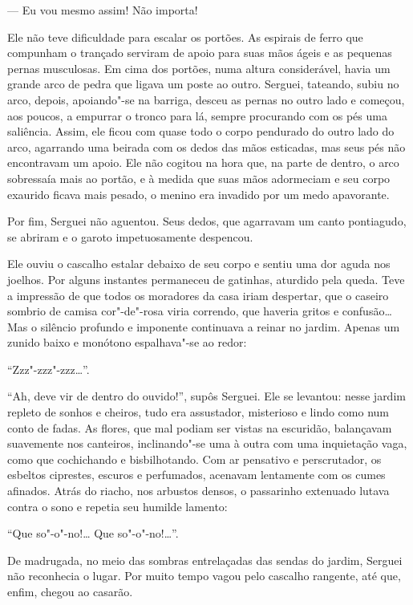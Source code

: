 
--- Eu vou mesmo assim! Não importa!

Ele não teve dificuldade para escalar os portões. As espirais de ferro
que compunham o trançado serviram de apoio para suas mãos ágeis e as
pequenas pernas musculosas. Em cima dos portões, numa altura
considerável, havia um grande arco de pedra que ligava um poste ao
outro. Serguei, tateando, subiu no arco, depois, apoiando"-se na barriga,
desceu as pernas no outro lado e começou, aos poucos, a empurrar o
tronco para lá, sempre procurando com os pés uma saliência. Assim, ele
ficou com quase todo o corpo pendurado do outro lado do arco, agarrando
uma beirada com os dedos das mãos esticadas, mas seus pés não encontravam
um apoio. Ele não cogitou na hora que, na parte de dentro, o arco
sobressaía mais ao portão, e à medida que suas mãos adormeciam e seu
corpo exaurido ficava mais pesado, o menino era invadido por um medo
apavorante.

Por fim, Serguei não aguentou. Seus dedos, que agarravam um canto
pontiagudo, se abriram e o garoto impetuosamente despencou.

Ele ouviu o cascalho estalar debaixo de seu corpo e sentiu uma dor aguda
nos joelhos. Por alguns instantes permaneceu de gatinhas, aturdido
pela queda. Teve a impressão de que todos os moradores da casa iriam
despertar, que o caseiro sombrio de camisa cor"-de"-rosa viria correndo,
que haveria gritos e confusão\ldots{} Mas o silêncio profundo e imponente
continuava a reinar no jardim. Apenas um zunido baixo e monótono
espalhava"-se ao redor:

``Zzz"-zzz"-zzz\ldots{}''.

``Ah, deve vir de dentro do ouvido!'', supôs Serguei. Ele se levantou:
nesse jardim repleto de sonhos e cheiros, tudo era assustador,
misterioso e lindo como num conto de fadas. As flores, que mal podiam
ser vistas na escuridão, balançavam suavemente nos canteiros,
inclinando"-se uma à outra com uma inquietação vaga, como que cochichando
e bisbilhotando. Com ar pensativo e perscrutador, os esbeltos ciprestes,
escuros e perfumados, acenavam lentamente com os cumes afinados. Atrás
do riacho, nos arbustos densos, o passarinho extenuado lutava contra o
sono e repetia seu humilde lamento:

``Que so"-o"-no!\ldots{} Que so"-o"-no!\ldots{}''.

De madrugada, no meio das sombras entrelaçadas das sendas do jardim,
Serguei não reconhecia o lugar. Por muito tempo vagou pelo cascalho
rangente, até que, enfim, chegou ao casarão.

